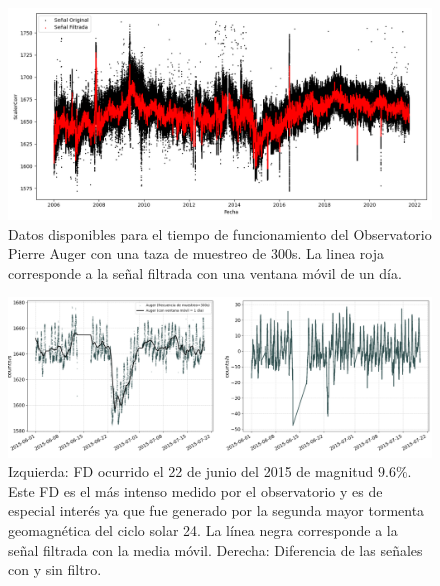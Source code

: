 \begin{figure}
\centering
\includegraphics[width=1\linewidth]{Figs/Figr/auger_filter_1D.png}
    \caption{Datos disponibles para el tiempo de funcionamiento del Observatorio Pierre Auger con una taza de muestreo de 300s. La linea roja corresponde a la señal filtrada con una ventana móvil de un día.}
    \label{1d_filter}
\end{figure}
\begin{figure}
\centering
\includegraphics[width=1.1\linewidth]{Figs/Figr/forbush_filter_1D_DIFERENCIA.pdf}
    \caption{Izquierda: FD ocurrido el 22 de junio del 2015 de magnitud $9.6\%$. Este FD es el más intenso medido por el observatorio y es de especial interés ya que fue generado por la segunda mayor tormenta geomagnética del ciclo solar 24. La línea negra corresponde a la señal filtrada con la media móvil. Derecha: Diferencia de las señales con y sin filtro.}
    \label{filter_result}
\end{figure}

